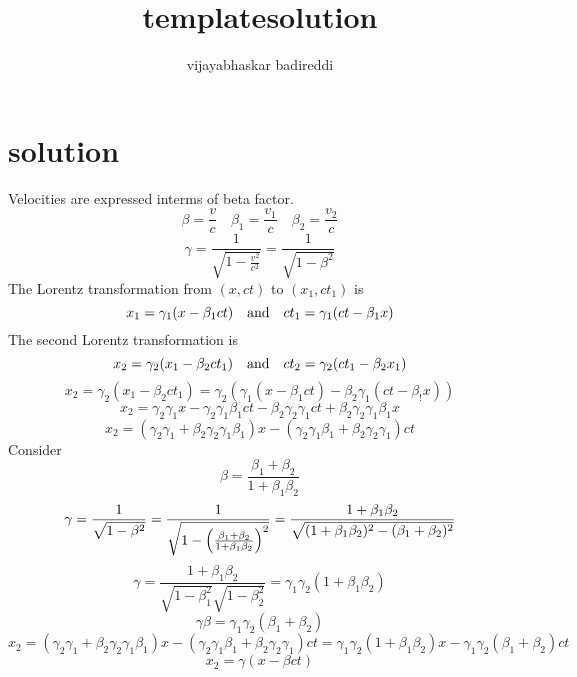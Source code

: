 \documentclass[12pt] {article}
\title{templatesolution}
\author{vijayabhaskar badireddi}
\begin{document}
        
\section*{solution}
Velocities are expressed interms of beta factor.
\[\beta=\frac{v}{c}\quad\beta_1=\frac{v_1}{c}\quad\beta_2=\frac{v_2}{c}\]
\[\gamma=\frac{1}{\sqrt{1-\frac{v^2}{c^2}}}=\frac{1}{\sqrt{1-\beta^2}}\]
The Lorentz transformation from $(x,ct)$ to $(x_1,ct_1)$ is
\[x_1=\gamma_1(x-\beta_1 ct)\qq{and}ct_1=\gamma_1(ct-\beta_1 x)\]
The second Lorentz transformation is
\[x_2=\gamma_2(x_1-\beta_2 ct_1)\qq{and}ct_2=\gamma_2(ct_1-\beta_2 x_1)\]
\[x_2=\gamma_2(x_1-\beta_2 ct_1)=\gamma_2(\gamma_1(x-\beta_1 ct)-\beta_2\gamma_1(ct-\beta_! x))\]
\[x_2=\gamma_2\gamma_1x-\gamma_2\gamma_1\beta_1 ct-\beta_2\gamma_2\gamma_1ct+\beta_2\gamma_2\gamma_1\beta_1 x\]
\[x_2=(\gamma_2\gamma_1+\beta_2\gamma_2\gamma_1\beta_1) x-(\gamma_2\gamma_1\beta_1 +\beta_2\gamma_2\gamma_1)ct\]
Consider \[\beta=\frac{\beta_1+\beta_2}{1+\beta_1\beta_2}\]
\[\gamma=\frac{1}{\sqrt{1-\beta^2}}=\frac{1}{\sqrt{1-\qty(\frac{\beta_1+\beta_2}{1+\beta_1\beta_2})^2}}=\frac{1+\beta_1\beta_2}{\sqrt{(1+\beta_1\beta_2)^2-(\beta_1+\beta_2)^2}}\]
\[\gamma=\frac{1+\beta_1\beta_2}{\sqrt{1-\beta_1^2}\sqrt{1-\beta_2^2}}=\gamma_1\gamma_2(1+\beta_1\beta_2)\]
\[\gamma\beta=\gamma_1\gamma_2(\beta_1+\beta_2)\]
\[x_2=(\gamma_2\gamma_1+\beta_2\gamma_2\gamma_1\beta_1) x-(\gamma_2\gamma_1\beta_1 +\beta_2\gamma_2\gamma_1)ct=\gamma_1\gamma_2(1+\beta_1\beta_2) x-\gamma_1\gamma_2(\beta_1 +\beta_2)ct\]
\[x_2=\gamma (x-\beta ct)\]
\end{document}
